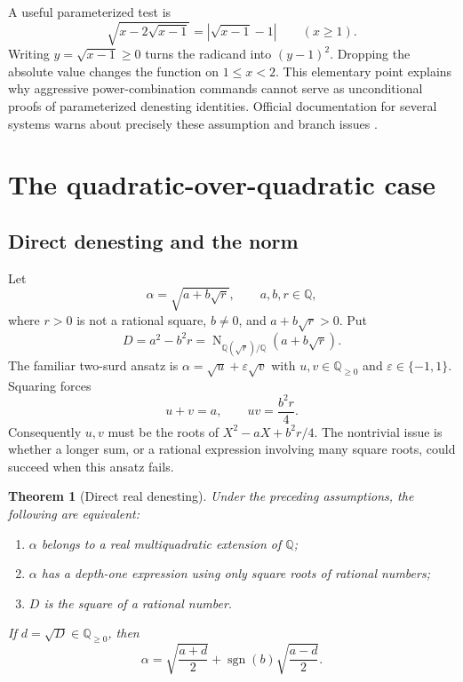 \documentclass[11pt,letterpaper]{article}
\numberwithin{equation}{section}
\newtheorem{theorem}{Theorem}[section]
\theoremstyle{definition}
\theoremstyle{remark}
\newcommand{\Q}{\mathbb{Q}}
\newcommand{\sgn}{\operatorname{sgn}}
\newcommand{\Nrm}{\operatorname{N}}
\begin{document}
A useful parameterized test is
\begin{equation}\label{eq:parameter}
\sqrt{x-2\sqrt{x-1}}=\left|\sqrt{x-1}-1\right|\qquad(x\ge1).
\end{equation}
Writing $y=\sqrt{x-1}\ge0$ turns the radicand into $(y-1)^2$. Dropping the absolute value changes the function on $1\le x<2$. This elementary point explains why aggressive power-combination commands cannot serve as unconditional proofs of parameterized denesting identities. Official documentation for several systems warns about precisely these assumption and branch issues \cite{sympy,wolframradicals,sage}.

\section{The quadratic-over-quadratic case}\label{sec:quadratic}

\subsection{Direct denesting and the norm}
Let
\begin{equation}\label{eq:alphaquadratic}
\alpha=\sqrt{a+b\sqrt r},\qquad a,b,r\in\Q,
\end{equation}
where $r>0$ is not a rational square, $b\ne0$, and $a+b\sqrt r>0$. Put
\[
D=a^2-b^2r=\Nrm_{\Q(\sqrt r)/\Q}(a+b\sqrt r).
\]
The familiar two-surd ansatz is $\alpha=\sqrt u+\varepsilon\sqrt v$ with $u,v\in\Q_{\ge0}$ and $\varepsilon\in\{-1,1\}$. Squaring forces
\[
u+v=a,\qquad uv=\frac{b^2r}{4}.
\]
Consequently $u,v$ must be the roots of $X^2-aX+b^2r/4$. The nontrivial issue is whether a longer sum, or a rational expression involving many square roots, could succeed when this ansatz fails.

\begin{theorem}[Direct real denesting]\label{thm:direct}
Under the preceding assumptions, the following are equivalent:
\begin{enumerate}[label=(\roman*),nosep]
\item $\alpha$ belongs to a real multiquadratic extension of $\Q$;
\item $\alpha$ has a depth-one expression using only square roots of rational numbers;
\item $D$ is the square of a rational number.
\end{enumerate}
If $d=\sqrt D\in\Q_{\ge0}$, then
\begin{equation}\label{eq:direct}
\alpha=\sqrt{\frac{a+d}{2}}+
\sgn(b)\sqrt{\frac{a-d}{2}}.
\end{equation}
\end{theorem}
\end{document}
